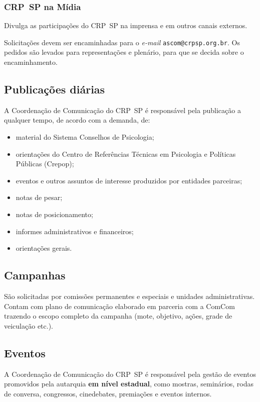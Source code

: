 \subsubsection{CRP~SP na Mídia}

Divulga as participações do CRP~SP na imprensa e em outros canais externos.

Solicitações devem ser encaminhadas para o \emph{e-mail} \nolinkurl{ascom@crpsp.org.br}. Os pedidos são levados para representações e
plenário, para que se decida sobre o encaminhamento.

\subsection{Publicações diárias}

A Coordenação de Comunicação do CRP~SP é responsável pela publicação a qualquer tempo, de acordo com a demanda, de:

\begin{itemize}
	\item
	material do Sistema Conselhos de Psicologia;
	\item
	orientações do Centro de Referências Técnicas em Psicologia e Políticas Públicas (Crepop);
	\item
	eventos e outros assuntos de interesse produzidos por entidades parceiras;
	\item
	notas de pesar;
	\item
	notas de posicionamento;
	\item
	informes administrativos e financeiros;
	\item
	orientações gerais.
\end{itemize}

\subsection{Campanhas}

São solicitadas por comissões permanentes e especiais e unidades administrativas. Contam com plano de comunicação elaborado em parceria com a ComCom trazendo o escopo completo da campanha (mote, objetivo, ações, grade de veiculação etc.).

\subsection{Eventos}

A Coordenação de Comunicação do CRP~SP é responsável pela gestão de eventos promovidos pela autarquia \textbf{em nível estadual}, como mostras, seminários, rodas de conversa, congressos, cinedebates, premiações e eventos internos.

